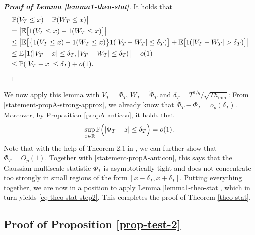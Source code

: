 \begin{proof}[\textnormal{\textbf{Proof of Lemma \ref{lemma1-theo-stat}}}] 
It holds that 
\begin{align*}
 & \big| \mathbb{P}(V_T \le x) - \mathbb{P}(W_T \le x) \big| \\
 & = \big| \mathbb{E} \big[ 1(V_T \le x) - 1(W_T \le x) \big] \big| \\
 & \le \big| \mathbb{E} \big[ \big\{ 1(V_T \le x) - 1(W_T \le x) \big\} 1(|V_T - W_T| \le \delta_T) \big] + \mathbb{E} \big[ 1(|V_T - W_T| > \delta_T) \big] \big| \\
 & \le \mathbb{E} \big[ 1(|V_T - x| \le \delta_T, |V_T - W_T| \le \delta_T) \big] + o(1) \\
 & \le \mathbb{P} (|V_T - x| \le \delta_T) + o(1). \qedhere
\end{align*}
\end{proof}
We now apply this lemma with $V_T = \Phi_T$, $W_T = \widetilde{\Phi}_T$ and $\delta_T = T^{1/q} / \sqrt{T h_{\min}}$: From \eqref{statement-propA-strong-approx}, we already know that $\widetilde{\Phi}_T - \Phi_T = o_p(\delta_T)$. Moreover, by Proposition \ref{propA-anticon}, it holds that 
\begin{equation}\label{statement-propA-anticon}
\sup_{x \in \mathbb{R}} \mathbb{P} \Big( | \Phi_T - x | \le \delta_T \Big) = o(1). 
\end{equation}
Note that with the help of Theorem 2.1 in \cite{DuembgenSpokoiny2001}, we can further show that $\Phi_T = O_p(1)$. Together with \eqref{statement-propA-anticon}, this says that the Gaussian multiscale statistic $\Phi_T$ is asymptotically tight and does not concentrate too strongly in small regions of the form $[x - \delta_T,x + \delta_T]$. Putting everything together, we are now in a position to apply Lemma \ref{lemma1-theo-stat}, which in turn yields \eqref{eq-theo-stat-step2}. This completes the proof of Theorem \ref{theo-stat}. 



\subsection*{Proof of Proposition \ref{prop-test-2}}



